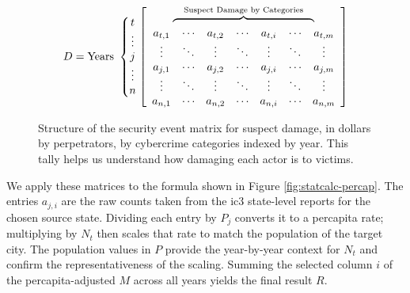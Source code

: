 \begin{figure}[H]
  \centering
\[
D=
\text{Years }\left\{
\begin{matrix}
t\\ \vdots\\ j\\ \vdots\\ n
\end{matrix}
\right.
\left[
\begin{array}{ccccccc}
\multicolumn{7}{c}{%
  \overbrace{%
    \hphantom{a_{t,1}\ \cdots\ a_{t,2}\ \cdots\ a_{t,i}\ \cdots\ a_{t,m}}%
  }^{\text{Suspect Damage by Categories}}%
}\\
a_{t,1} & \cdots & a_{t,2} & \cdots & a_{t,i} & \cdots & a_{t,m} \\
\vdots  & \ddots & \vdots  & \ddots & \vdots  & \ddots & \vdots \\
a_{j,1} & \cdots & a_{j,2} & \cdots & a_{j,i} & \cdots & a_{j,m} \\
\vdots  & \ddots & \vdots  & \ddots & \vdots  & \ddots & \vdots \\
a_{n,1} & \cdots & a_{n,2} & \cdots & a_{n,i} & \cdots & a_{n,m}
\end{array}
\right]
\]

  \caption{Structure of the security event \gls{matrix} for suspect damage, in dollars by perpetrators, by  \gls{cybercrime} categories indexed by year.  This tally helps us understand how damaging each actor is to victims.}
  \label{fig:statevent-suspectdamage}
\end{figure}


We apply these matrices to the formula shown in Figure \ref{fig:statcalc-percap}. The entries $a_{j,i}$ are the raw counts taken from the \gls{ic3} state-level reports for the chosen source state.  Dividing each entry by $P_j$ converts it to a \gls{percapita} rate; multiplying by $N_t$ then scales that rate to match the  \gls{population} of the target city.  The  \gls{population} values in $P$ provide the year-by-year context for $N_t$ and confirm the representativeness of the scaling.  Summing the selected column $i$ of the \gls{percapita}-adjusted $M$ across all years yields the final result $R$.
